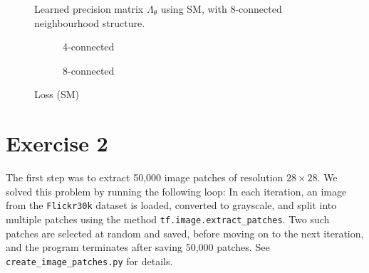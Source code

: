 \documentclass[a4paper]{article}
\theoremstyle{definition}
\theoremstyle{plain}
\begin{document}
\begin{figure}[H]
	\centering
	\begin{subfigure}[b]{0.49\textwidth}
		
		\caption{}
	\end{subfigure}
	\hfill
	\begin{subfigure}[b]{0.49\textwidth}
		
		\caption{}
	\end{subfigure}
	\caption{Learned precision matrix $\Lambda_\theta$ using SM, with 8-connected neighbourhood structure.}
	\label{precision_matrix_SM_fig2}
\end{figure}


\begin{figure}[H]
	\centering
	\begin{subfigure}[b]{0.49\textwidth}
		
		\caption{4-connected}
	\end{subfigure}
	\hfill
	\begin{subfigure}[b]{0.49\textwidth}
		
		\caption{8-connected}
	\end{subfigure}
	\caption{Loss (SM)}
	\label{loss_SM_fig}
\end{figure}





















\section*{\center Exercise 2}

The first step was to extract 50,000 image patches of resolution $28\times 28$. We solved this problem by running the following loop: In each iteration, an image from the \texttt{Flickr30k} dataset is loaded, converted to grayscale, and split into multiple patches using the method \texttt{tf.image.extract\_patches}. Two such patches are selected at random and saved, before moving on to the next iteration, and the program terminates after saving 50,000 patches. See \texttt{create\_image\_patches.py} for details.
\end{document}
